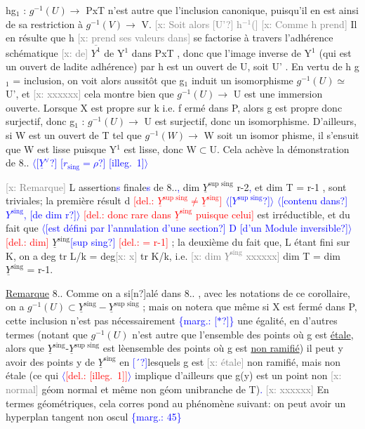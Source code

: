 \documentclass[11pt]{article}
\newcommand{\hand}[1]{\textcolor{blue}{#1}}
\let\over\relax
\newcommand{\over}[2]{\textcolor{gray}{#1}\textcolor{blue}{\ensuremath{^{\!\nearrow}}#2}}
\newcommand{\inserted}[2][]{\textcolor{blue}{$\langle$#2$\rangle$}}
\newcommand{\margin}[1]{\textcolor{blue}{\{\textsf{marg.:} #1\}}}
\newcommand{\deleted}[1]{\textcolor{red}{[\textsf{del.:} #1]}}
\newcommand{\xout}[1]{\textcolor{gray}{[\textsf{x:} #1]}}
\newcommand{\uline}[1]{\underline{#1}}
\newcommand{\unsure}[1]{[#1?]}
\newcommand{\illegible}[1]{[\textsf{illeg.\ #1}]}
\begin{document}
hg$_1$ :  $g^{-1}(U) \longrightarrow$ PxT  n'est autre que l'inclusion canonique, puisqu'il
en est ainsi de sa restriction à $g^{-1}(V) \rightarrow$ V.  \xout{Soit alors \unsure{U'} h$^{-1}$(}
\xout{Comme h prend} Il en résulte que h \xout{prend ses valeurs dans} se factorise
à travers l'adhérence schématique \xout{de} $\overline{Y^1}$ de Y$^1$ dans  PxT , donc que
l'image inverse de Y$^1$ (qui est un ouvert de ladite adhérence) par h
est un ouvert de U, soit U' . En vertu de  h g$_1$ = inclusion, on
voit alors aussitôt que  g$_1$ induit un isomorphisme  $g^{-1}(U) \simeq$ U', et
\xout{xxxxxx} cela montre bien que  $g^{-1}(U) \longrightarrow$ U est une immersion ouverte.
Lorsque X est propre sur k i.e. f ermé dans P, alors  g est propre donc
surjectif, donc  g$_1$ : $g^{-1}(U) \longrightarrow$ U est surjectif, donc un isomorphisme.
D'ailleurs, si  W est un ouvert de T tel que  $g^{-1}(W) \longrightarrow$ W soit un isomor%
phisme, il s'ensuit que W est lisse puisque Y$^1$ est lisse, donc W$\subset$U.
Cela achève la démonstration de 8.\over{\unsure{8}}{9}. \inserted{\unsure{$\underline{Y}^{\vee}$} \unsure{$r_{\text{sing}} = \rho$} \illegible{1}}

\xout{Remarque}  L\over{'}{es} assertion\hand{s} finale\hand{s} de 8.\over{\unsure{7}}{8}.\hand{,} dim $\underline{Y}^{\text{sup sing}}$ \over{=}{\unsure{$\leq$}} r-2\hand{,} et
dim T = r-1 , sont triviales;  la première résult\over{ant}{\unsure{e}} d\over{u}{\unsure{e}} \deleted{$\underline{Y}^{\text{sup sing}} \neq \underline{Y}^{\text{sing}}$}
\inserted{\unsure{$Y^{\text{sup sing}}$}} \inserted{\unsure{contenu dans} $Y^{\text{sing}}$, \unsure{de dim r}} \deleted{donc rare dans $\underline{Y}^{\text{sing}}$ puisque celui} est irréductible, et du fait que
\inserted{\unsure{est défini par l'annulation d'une section} D \unsure{d'un Module inversible}} \deleted{dim} $\underline{Y}^{\text{sing}}$\hand{\unsure{sup sing}} \deleted{= r-1} ; la deuxième du fait que, L étant fini sur K, on a
deg tr L/k = deg\xout{x} tr K/k, i.e.  \xout{dim $\underline{Y}^{\text{sing}}$ xxxxxx} dim T = dim $\underline{Y}^{\text{sing}}$ = r-1.

\uline{Remarque} 8.\over{\unsure{9}}{10}.  Comme on a si\over{n}{g}\unsure{n}alé dans  8.\over{\unsure{8}}{9}. , avec les notations de
ce corollaire, on a  $g^{-1}(U) \subset \underline{Y}^{\text{sing}} - \underline{Y}^{\text{sup sing}}$ ; mais on notera que
même si X est fermé dans P,  cette inclusion n'est pas nécessairement
\margin{\unsure{$\ast$}} une égalité, en d'autres termes (notant que $g^{-1}(U)$ n'est autre que
l'ensemble des points où g est \uline{étale}, alors que $\underline{Y}^{\text{sing}}$-$\underline{Y}^{\text{sup sing}}$ est
lèensemble des points où g est \uline{non ramifié}) il peut y avoir des points
y de $\underline{Y}^{\text{sing}}$ en \hand{\unsure{´}}lesquels  g est \xout{étale} non ramifié, mais non étale (ce qui
\inserted{\deleted{\illegible{1}}} implique d'ailleurs que g(y) est un point non \xout{normal} géom normal et même
non géom unibranche de  T)\hand{.} \xout{xxxxxx} En termes géométriques, cela corres%
pond au phénomène suivant: on peut avoir un hyperplan tangent non oscul
\margin{45}
\end{document}
